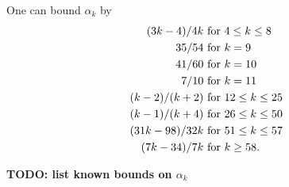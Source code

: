 \begin{theorem}\cite[Theorem 13.12]{ivic}  One can bound $\alpha_k$ by
    \begin{align*}
        (3k-4)/4k & \hbox{ for } 4 \leq k \leq 8 \\
        35/54 & \hbox{ for } k = 9 \\
        41/60 & \hbox{ for } k = 10 \\
        7/10 & \hbox{ for } k = 11 \\
        (k-2)/(k+2) & \hbox{ for } 12 \leq k \leq 25 \\
        (k-1)/(k+4) & \hbox{ for } 26 \leq k \leq 50 \\
        (31k-98)/32k & \hbox{ for } 51 \leq k \leq 57 \\
        (7k-34)/7k & \hbox{ for } k \geq 58.
    \end{align*}
\end{theorem}


{\bf TODO: list known bounds on $\alpha_k$}

